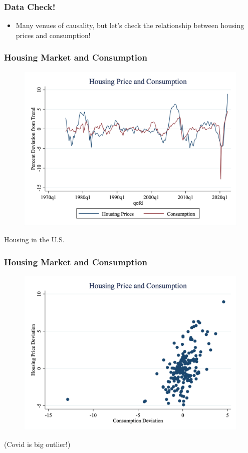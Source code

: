 \documentclass{beamer}
\begin{document}
\begin{frame}
\frametitle[alignment=center]{Data Check!}
\begin{itemize}
\item Many venues of causality, but let's check the relationship between housing prices and consumption!
\end{itemize}
 \end{frame}


\begin{frame}
\frametitle[alignment=center]{Housing Market and Consumption}
\begin{figure}
\includegraphics[scale=0.25]{Figures/H1.png}
\end{figure}
Housing in the U.S.
 \end{frame}


\begin{frame}
\frametitle[alignment=center]{Housing Market and Consumption}
\begin{figure}
\includegraphics[scale=0.25]{Figures/H2.png}
\end{figure}
(Covid is big outlier!)
 \end{frame}
\end{document}
